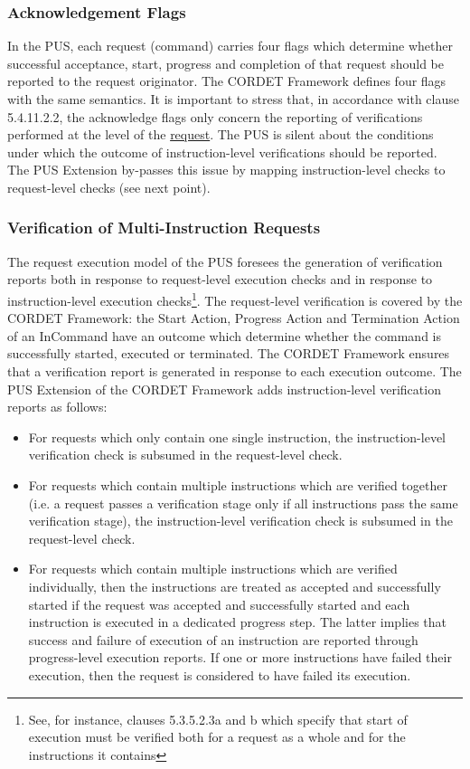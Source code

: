 \documentclass{pnp_article}
\begin{document}
\subsubsection{Acknowledgement Flags} In the PUS, each request (command) carries four flags which determine whether successful acceptance, start, progress and completion of that request should be reported to the request originator. The CORDET Framework defines four flags with the same semantics. It is important to stress that, in accordance with clause 5.4.11.2.2, the acknowledge flags only concern the reporting of verifications performed at the level of the \underline{request}. The PUS is silent about the conditions under which the outcome of instruction-level verifications should be reported. The PUS Extension by-passes this issue by mapping instruction-level checks to request-level checks (see next point). 


\subsubsection{Verification of Multi-Instruction Requests}
The request execution model of the PUS foresees the generation of verification reports both in response to request-level execution checks and in response to instruction-level execution checks\footnote{See, for instance, clauses 5.3.5.2.3a and b which specify that start of execution must be verified both for a request as a whole and for the instructions it contains}. The request-level verification is covered by the CORDET Framework: the Start Action, Progress Action and Termination Action of an InCommand have an outcome which determine whether the command is successfully started, executed or terminated. The CORDET Framework ensures that a verification report is generated in response to each execution outcome. The PUS Extension of the CORDET Framework adds instruction-level verification reports as follows:

\begin{itemize}
\item For requests which only contain one single instruction, the instruction-level verification check is subsumed in the request-level check.
\item For requests which contain multiple instructions which are verified together (i.e. a request passes a verification stage only if all instructions pass the same verification stage), the instruction-level verification check is subsumed in the request-level check.
\item For requests which contain multiple instructions which are verified individually, then the instructions are treated as accepted and successfully started if the request was accepted and successfully started and each instruction is executed in a dedicated progress step. The latter implies that success and failure of execution of an instruction are reported through progress-level execution reports. If one or more instructions have failed their execution, then the request is considered to have failed its execution.
\end{itemize}
\end{document}
